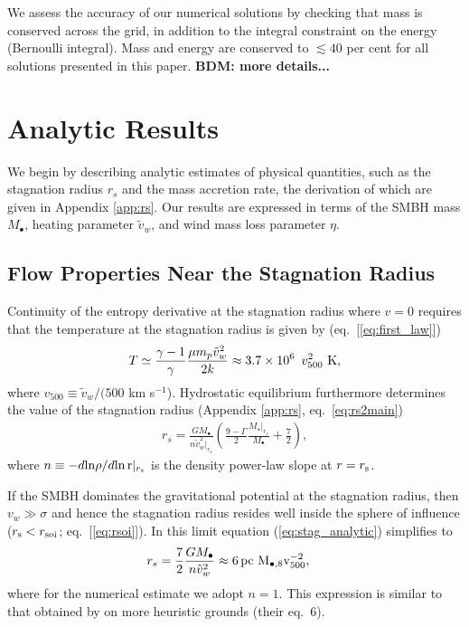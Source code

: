 \documentclass[usenatbib,fleqn]{mn2e}
\newcommand{\rs}{r_s}
\newcommand{\vw}{\tilde{v}_{w}}
\newcommand{\pc}{\rm pc}
\newcommand{\Mbh}[1][]{M_{\bullet#1}}
\newcommand{\Mbheight}{M_{\bullet,8}}
\begin{document}
We assess the accuracy of our numerical solutions by checking that mass is conserved across the grid, in addition to the integral constraint on the energy (Bernoulli integral).  Mass and energy are conserved to $\lesssim
40$ per cent for all solutions presented in this paper.  {\bf BDM:
  more details...}


\section{Analytic Results}
\label{sec:results}

We begin by describing analytic estimates of physical quantities, such as the stagnation radius $\rs$ and the mass accretion rate, the derivation of which are given in Appendix \ref{app:rs}.  Our results are expressed in terms of the SMBH mass $M_{\bullet}$, heating parameter $\tilde{v}_{w}$, and wind mass loss parameter $\eta$.

\subsection{Flow Properties Near the Stagnation Radius}

Continuity of the entropy derivative at the stagnation radius where $v = 0$ requires that the temperature at the stagnation radius is given by (eq.~[\ref{eq:first_law}])
\begin{align}
T \simeq \frac{\gamma-1}{\gamma}\frac{\mu m_p \tilde{v}_{w}^{2}}{2k} \approx 3.7
\times 10^6\ \, v_{500}^2 \,\,{\rm K},
\label{eq:Tanalytic}
\end{align}
where $v_{500} \equiv \tilde{v}_{w}/(500$ km s$^{-1}$).  Hydrostatic equilibrium furthermore determines the value of the stagnation radius (Appendix \ref{app:rs}, eq.~\ref{eq:rs2main})
\begin{align}
\rs=\frac{G \Mbh}{n \vw^{2}|_{\rs}}\left(\frac{9-\Gamma}{2} \frac{M_{\star}|_{\rs}}{\Mbh} +\frac{7}{2}\right),
\label{eq:stag_analytic}
\end{align}
where $n \equiv -d{\rm ln}\rho/d{\rm ln\,r}|_{r_{\rm s}}$ is the density power-law slope at $r = r_{\rm s}$.  

If the SMBH dominates the gravitational potential at the stagnation radius, then $v_{w} \gg \sigma$ and hence the stagnation radius resides well inside the sphere of influence ($r_{\rm s} < r_{\rm soi}$; eq.~[\ref{eq:rsoi}]).  In this limit equation (\ref{eq:stag_analytic}) simplifies to
\begin{align}
  &\rs=\frac{7}{2}\frac{G \Mbh}{n \tilde{v}_{w}^{2}} \approx 6
 \, \pc \,\, \Mbheight v_{500}^{-2},
  \label{eq:stag_simple}
\end{align}
where for the numerical estimate we adopt $n = 1$.  This expression is similar to that obtained by \citet{Volonteri+11} on more heuristic grounds (their eq.~6).  
\end{document}
